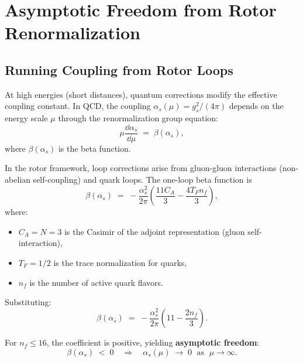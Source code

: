 \documentclass[11pt,a4paper]{article}
\theoremstyle{definition}
\theoremstyle{plain}
\theoremstyle{remark}
\begin{document}
\vspace{1em}

\section{Asymptotic Freedom from Rotor Renormalization}
\label{sec:asymptotic-freedom}

\subsection{Running Coupling from Rotor Loops}

At high energies (short distances), quantum corrections modify the effective coupling constant. In QCD, the coupling $\alpha_s(\mu) = g_s^2/(4\pi)$ depends on the energy scale $\mu$ through the renormalization group equation:
\begin{equation}
\mu \frac{\dd\alpha_s}{\dd\mu} \;=\; \beta(\alpha_s),
\label{eq:rge}
\end{equation}
where $\beta(\alpha_s)$ is the beta function.

In the rotor framework, loop corrections arise from gluon-gluon interactions (non-abelian self-coupling) and quark loops. The one-loop beta function is
\begin{equation}
\beta(\alpha_s) \;=\; -\frac{\alpha_s^2}{2\pi}\left(\frac{11C_A}{3} - \frac{4T_F n_f}{3}\right),
\label{eq:beta-function}
\end{equation}
where:
\begin{itemize}[leftmargin=*,itemsep=3pt]
  \item $C_A = N = 3$ is the Casimir of the adjoint representation (gluon self-interaction),
  \item $T_F = 1/2$ is the trace normalization for quarks,
  \item $n_f$ is the number of active quark flavors.
\end{itemize}

Substituting:
\begin{equation}
\beta(\alpha_s) \;=\; -\frac{\alpha_s^2}{2\pi}\left(11 - \frac{2n_f}{3}\right).
\label{eq:beta-qcd}
\end{equation}

For $n_f \le 16$, the coefficient is positive, yielding \textbf{asymptotic freedom}:
\begin{equation}
\beta(\alpha_s) \;<\; 0 \quad\Rightarrow\quad \alpha_s(\mu) \;\to\; 0 \;\text{ as }\; \mu \to \infty.
\end{equation}
\end{document}
